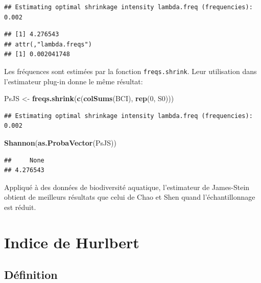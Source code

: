 \documentclass[
  11pt,
  french,
  a4paper,
  extrafontsizes,onecolumn,openright
  ]{memoir}
\newenvironment{Shaded}{\begin{snugshade}}{\end{snugshade}}
\newcommand{\DecValTok}[1]{\textcolor[rgb]{0.00,0.00,0.81}{#1}}
\newcommand{\FunctionTok}[1]{\textcolor[rgb]{0.13,0.29,0.53}{\textbf{#1}}}
\newcommand{\NormalTok}[1]{#1}
\newcommand{\OtherTok}[1]{\textcolor[rgb]{0.56,0.35,0.01}{#1}}
\begin{document}
\begin{verbatim}
## Estimating optimal shrinkage intensity lambda.freq (frequencies): 0.002
\end{verbatim}

\begin{verbatim}
## [1] 4.276543
## attr(,"lambda.freqs")
## [1] 0.002041748
\end{verbatim}

\normalsize

Les fréquences sont estimées par la fonction \texttt{freqs.shrink}.
Leur utilisation dans l'estimateur plug-in donne le même résultat:

\scriptsize

\begin{Shaded}
\begin{Highlighting}[]
\NormalTok{PsJS }\OtherTok{\textless{}{-}} \FunctionTok{freqs.shrink}\NormalTok{(}\FunctionTok{c}\NormalTok{(}\FunctionTok{colSums}\NormalTok{(BCI), }\FunctionTok{rep}\NormalTok{(}\DecValTok{0}\NormalTok{, S0)))}
\end{Highlighting}
\end{Shaded}

\begin{verbatim}
## Estimating optimal shrinkage intensity lambda.freq (frequencies): 0.002
\end{verbatim}

\begin{Shaded}
\begin{Highlighting}[]
\FunctionTok{Shannon}\NormalTok{(}\FunctionTok{as.ProbaVector}\NormalTok{(PsJS))}
\end{Highlighting}
\end{Shaded}

\begin{verbatim}
##     None 
## 4.276543
\end{verbatim}

\normalsize

Appliqué à des données de biodiversité aquatique, l'estimateur de James-Stein obtient de meilleurs résultats que celui de Chao et Shen \autocite{Liu2015} quand l'échantillonnage est réduit.

\section{Indice de Hurlbert}\label{sec-Hurlbert}

\subsection{Définition}\label{duxe9finition-2}
\end{document}
